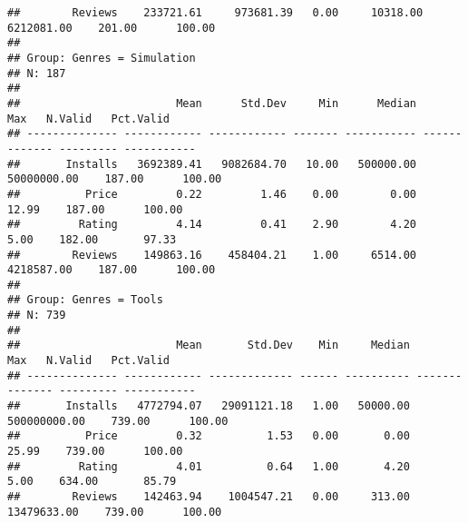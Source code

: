 \documentclass[
]{article}
\begin{document}
\begin{verbatim}
##        Reviews    233721.61     973681.39   0.00     10318.00     6212081.00    201.00      100.00
## 
## Group: Genres = Simulation  
## N: 187  
## 
##                        Mean      Std.Dev     Min      Median           Max   N.Valid   Pct.Valid
## -------------- ------------ ------------ ------- ----------- ------------- --------- -----------
##       Installs   3692389.41   9082684.70   10.00   500000.00   50000000.00    187.00      100.00
##          Price         0.22         1.46    0.00        0.00         12.99    187.00      100.00
##         Rating         4.14         0.41    2.90        4.20          5.00    182.00       97.33
##        Reviews    149863.16    458404.21    1.00     6514.00    4218587.00    187.00      100.00
## 
## Group: Genres = Tools  
## N: 739  
## 
##                        Mean       Std.Dev    Min     Median            Max   N.Valid   Pct.Valid
## -------------- ------------ ------------- ------ ---------- -------------- --------- -----------
##       Installs   4772794.07   29091121.18   1.00   50000.00   500000000.00    739.00      100.00
##          Price         0.32          1.53   0.00       0.00          25.99    739.00      100.00
##         Rating         4.01          0.64   1.00       4.20           5.00    634.00       85.79
##        Reviews    142463.94    1004547.21   0.00     313.00    13479633.00    739.00      100.00
\end{verbatim}
\end{document}
